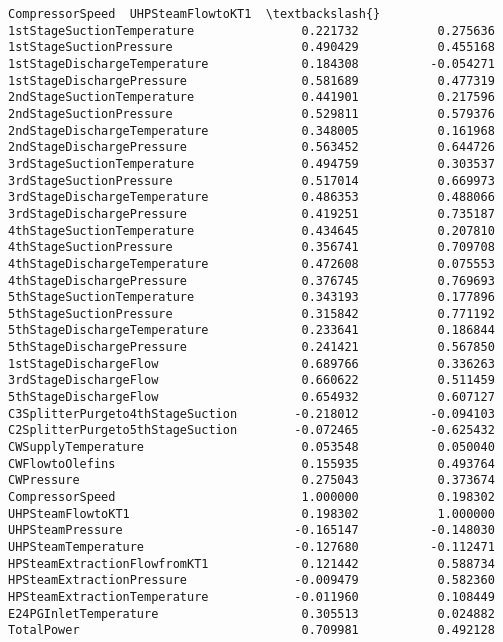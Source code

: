 \documentclass[11pt]{article}
\begin{document}
\begin{tcolorbox}[breakable, size=fbox, boxrule=.5pt, pad at break*=1mm, opacityfill=0]
\begin{Verbatim}[commandchars=\\\{\}]
                                  CompressorSpeed  UHPSteamFlowtoKT1  \textbackslash{}
1stStageSuctionTemperature               0.221732           0.275636
1stStageSuctionPressure                  0.490429           0.455168
1stStageDischargeTemperature             0.184308          -0.054271
1stStageDischargePressure                0.581689           0.477319
2ndStageSuctionTemperature               0.441901           0.217596
2ndStageSuctionPressure                  0.529811           0.579376
2ndStageDischargeTemperature             0.348005           0.161968
2ndStageDischargePressure                0.563452           0.644726
3rdStageSuctionTemperature               0.494759           0.303537
3rdStageSuctionPressure                  0.517014           0.669973
3rdStageDischargeTemperature             0.486353           0.488066
3rdStageDischargePressure                0.419251           0.735187
4thStageSuctionTemperature               0.434645           0.207810
4thStageSuctionPressure                  0.356741           0.709708
4thStageDischargeTemperature             0.472608           0.075553
4thStageDischargePressure                0.376745           0.769693
5thStageSuctionTemperature               0.343193           0.177896
5thStageSuctionPressure                  0.315842           0.771192
5thStageDischargeTemperature             0.233641           0.186844
5thStageDischargePressure                0.241421           0.567850
1stStageDischargeFlow                    0.689766           0.336263
3rdStageDischargeFlow                    0.660622           0.511459
5thStageDischargeFlow                    0.654932           0.607127
C3SplitterPurgeto4thStageSuction        -0.218012          -0.094103
C2SplitterPurgeto5thStageSuction        -0.072465          -0.625432
CWSupplyTemperature                      0.053548           0.050040
CWFlowtoOlefins                          0.155935           0.493764
CWPressure                               0.275043           0.373674
CompressorSpeed                          1.000000           0.198302
UHPSteamFlowtoKT1                        0.198302           1.000000
UHPSteamPressure                        -0.165147          -0.148030
UHPSteamTemperature                     -0.127680          -0.112471
HPSteamExtractionFlowfromKT1             0.121442           0.588734
HPSteamExtractionPressure               -0.009479           0.582360
HPSteamExtractionTemperature            -0.011960           0.108449
E24PGInletTemperature                    0.305513           0.024882
TotalPower                               0.709981           0.492128


\end{Verbatim}
\end{tcolorbox}
\end{document}
